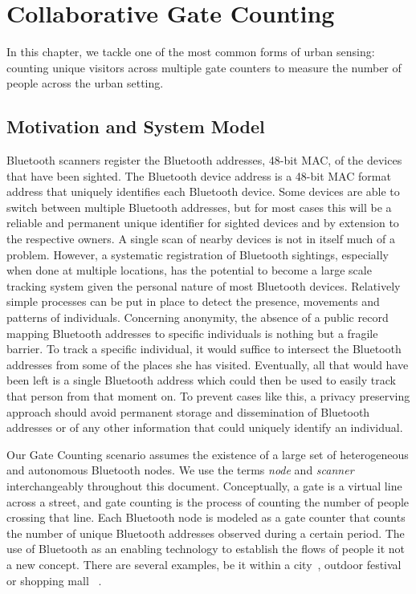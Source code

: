 \chapter{Collaborative Gate Counting}
\label{cha:gate-counting}

In this chapter, we tackle one of the most common forms of urban
sensing: counting unique visitors across multiple gate counters to
measure the number of people across the urban setting.

\section {Motivation and System Model}
\label{sec:motivation}

Bluetooth scanners register the Bluetooth addresses, 48-bit MAC, of
the devices that have been sighted. The Bluetooth device address is a
48-bit MAC format address that uniquely identifies each Bluetooth
device. Some devices are able to switch between multiple Bluetooth
addresses, but for most cases this will be a reliable and permanent
unique identifier for sighted devices and by extension to the
respective owners. A single scan of nearby devices is not in itself
much of a problem. However, a systematic registration of Bluetooth
sightings, especially when done at multiple locations, has the
potential to become a large scale tracking system given the personal
nature of most Bluetooth devices. Relatively simple processes can be
put in place to detect the presence, movements and patterns of
individuals. Concerning anonymity, the absence of a public record
mapping Bluetooth addresses to specific individuals is nothing but a
fragile barrier. To track a specific individual, it would suffice to
intersect the Bluetooth addresses from some of the places she has
visited. Eventually, all that would have been left is a single
Bluetooth address which could then be used to easily track that person
from that moment on. To prevent cases like this, a privacy preserving
approach should avoid permanent storage and dissemination of Bluetooth
addresses or of any other information that could uniquely identify an
individual.

Our Gate Counting scenario assumes the existence of a large set
of heterogeneous and autonomous Bluetooth nodes. We use the terms
\emph{node} and \emph{scanner} interchangeably throughout this document.
Conceptually, a gate is a virtual line across a street, and gate
counting is the process of counting the number of people crossing that
line. Each Bluetooth node is modeled as a gate counter that counts the
number of unique Bluetooth addresses observed during a certain period.
The use of Bluetooth as an enabling technology to establish the flows
of people it not a new concept. There are several examples, be it
within a city~\cite{Oneill:2006vq}, outdoor
festival~\cite{versichele2012use} or shopping mall
~\cite{millonig2008shadowing}.

